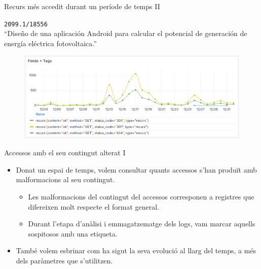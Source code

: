 \begin{frame}{Recurs més accedit durant un període de temps II}
    \begin{center}
        \texttt{2099.1/18556} \\
        ``Diseño de una aplicación Android para calcular el potencial de generación de energía eléctrica fotovoltaica.''
    \end{center}
    \begin{figure}
        \includegraphics[width=\textwidth]{figures/most-accessed-resource}
        \label{fig:use-case-1}
    \end{figure}
\end{frame}

\begin{frame}{Accessos amb el seu contingut alterat I}
    \begin{itemize}
        \item Donat un espai de temps, volem consultar quants accessos s'han produït amb malformacions al seu contingut.

        \begin{itemize}
            \item Les malformacions del contingut del accessos corresponen a registres que difereixen molt respecte el format general.
            \item Durant l'etapa d'anàlisi i emmagatzematge dels logs, vam marcar aquells sospitosos amb una etiqueta.
        \end{itemize}

        \item També volem esbrinar com ha sigut la seva evolució al llarg del temps, a més dels paràmetres que s'utilitzen.
    \end{itemize}
\end{frame}

